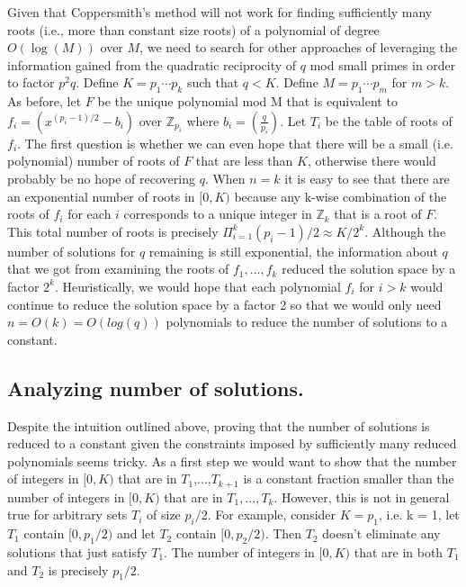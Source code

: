 \documentclass[letterpaper,twocolumn,10pt]{article}
\begin{document}
Given that Coppersmith's method will not work for finding sufficiently many roots (i.e., more than constant size roots) of a polynomial of degree $O(\log(M))$ over $M$, we need to search for other approaches of leveraging the information gained from the quadratic reciprocity of $q$ mod small primes in order to factor $p^2 q$. Define $K = p_1 \cdots p_k$ such that $q < K$. Define $M = p_1 \cdots p_m$ for $m > k$. As before, let $F$ be the unique polynomial mod M that is equivalent to $f_i = (x^{(p_i - 1)/2} - b_i)$ over $\mathbb{Z}_{p_i}$ where $b_i =  \left(\frac{q}{p_i}\right)$. Let $T_i$ be the table of roots of $f_i$. The first question is whether we can even hope that there will be a small (i.e. polynomial) number of roots of $F$ that are less than $K$, otherwise there would probably be no hope of recovering $q$. When $n = k$ it is easy to see that there are an exponential number of roots in $[0, K)$ because any k-wise combination of the roots of $f_i$ for each $i$ corresponds to a unique integer in $\mathbb{Z}_k$ that is a root of $F$. This total number of roots is precisely $\Pi_{i= 1}^k (p_i - 1)/2 \approx K/2^k$. Although the number of solutions for $q$ remaining is still exponential, the information about $q$ that we got from examining the roots of $f_1,...,f_k$ reduced the solution space by a factor $2^k$. Heuristically, we would hope that each polynomial $f_i$ for $i > k$ would continue to reduce the solution space by a factor 2 so that we would only need $n = O(k) = O(log(q))$ polynomials to reduce the number of solutions to a constant. 

\subsection{Analyzing number of solutions.} Despite the intuition outlined above, proving that the number of solutions is reduced to a constant given the constraints imposed by sufficiently many reduced polynomials seems tricky.  As a first step we would want to show that the number of integers in $[0,K)$ that are in $T_1$,...,$T_{k+1}$ is a constant fraction smaller than the number of integers in $[0,K)$ that are in $T_1,...,T_k$. However, this is not in general true for arbitrary sets $T_i$ of size $p_i/2$. For example, consider $K = p_1$, i.e. k = 1, let $T_1$ contain $[0, p_1/2)$ and let $T_2$ contain $[0, p_2/2)$. Then $T_2$ doesn't eliminate any solutions that just satisfy $T_1$. The number of integers in $[0,K)$ that are in both $T_1$ and $T_2$ is precisely $p_1/2$. 
\end{document}
